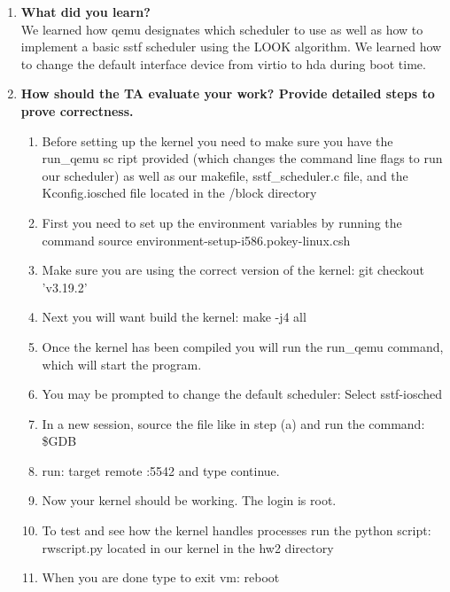 \documentclass[letterpaper,10pt,notitlepage,fleqn]{article}
\begin{document}
\begin{enumerate}
\item \textbf{What did you learn?}
\\ We learned how qemu designates which scheduler to use as well as how to implement a basic sstf scheduler using the LOOK algorithm. We learned how to change the default interface device from virtio to hda during boot time. 

\item \textbf{How should the TA evaluate your work? Provide detailed steps to prove correctness.} 	\begin{enumerate}
	\item Before setting up the kernel you need to make sure you have the run\_qemu sc ript provided (which changes the command line flags to run our scheduler) as well as our makefile, sstf\_scheduler.c file, and the Kconfig.iosched file located in the /block directory
	\item First you need to set up the environment variables by running the command source environment-setup-i586.pokey-linux.csh
    
    \item Make sure you are using the correct version of the kernel: git checkout 'v3.19.2' 
    \item Next you will want build the kernel: make -j4 all
    \item Once the kernel has been compiled you will run the run\_qemu command, which will start the program.
    \item You may be prompted to change the default scheduler: Select sstf-iosched
    \item In a new session, source the file like in step (a) and run the command: \$GDB 
    \item run: target remote :5542 and type continue.
    \item Now your kernel should be working. The login is root. 
    \item To test and see how the kernel handles processes run the python script: rwscript.py located in our kernel in the hw2 directory 
    \item When you are done type to exit vm: reboot 
	\end{enumerate}
\end{enumerate}
\end{document}
